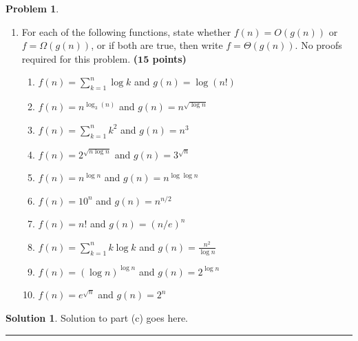 \documentclass{article}
\theoremstyle{definition}
\newtheorem{problem}{Problem}
\def\fline{\rule{0.75\linewidth}{0.5pt}}
\newcommand{\finishline}{
  \begin{center}\fline
\end{center}}
\newtheorem*{solution*}{Solution}
\newenvironment{solution}{
\begin{solution*}}{{\finishline}
\end{solution*}}
\newcommand{\grade}[1]{\hfill{\textbf{($\mathbf{#1}$ points)}}}
\begin{document}
\begin{problem}
\begin{enumerate}
        \item[(c)] For each of the following functions, state whether $f(n) = O(g(n))$ or $f = \Omega(g(n))$, or if both are true, then write $f = \Theta(g(n))$. No proofs required for this problem.  \grade{15}
          \begin{enumerate}
            \item $f(n) = \sum_{k=1}^{n} \log k$ and $g(n) = \log(n!)$
            \item $f(n) = n^{\log_3(n)}$ and $g(n) = n^{\sqrt{\log n}}$
            \item $f(n) = \sum_{k=1}^{n} k^2$ and $g(n) = n^3$
            \item $f(n) = 2^{\sqrt{n \log n}}$ and $g(n) = 3^{\sqrt{n}}$
            \item $f(n) = n^{\log n}$ and $g(n) = n^{\log \log n}$
            \item $f(n) = 10^n$ and $g(n) = n^{n/2}$
            \item $f(n) = n!$ and $g(n) = (n/e)^n$
            \item $f(n) = \sum_{k=1}^{n} k \log k$ and $g(n) = \frac{n^2}{\log n}$
            \item $f(n) = (\log n)^{\log n}$ and $g(n) = 2^{\log n}$
            \item $f(n) = e^{\sqrt{n}}$ and $g(n) = 2^n$
          \end{enumerate}

      \end{enumerate}
    \end{problem}

    \begin{solution}
      Solution to part (c) goes here. %
    \end{solution}

    \newpage
\end{document}
